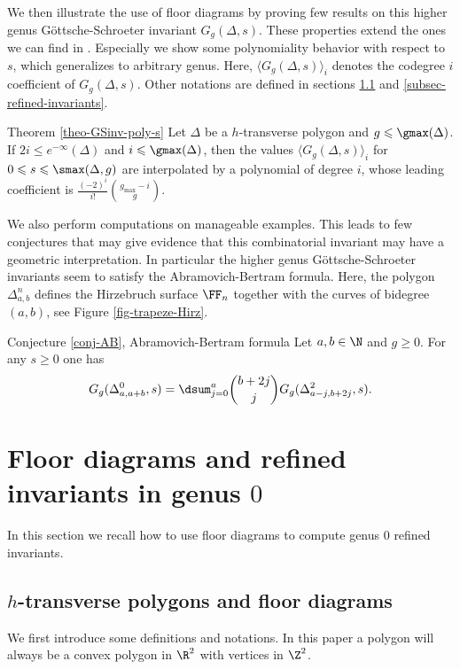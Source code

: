 We then illustrate the use of floor diagrams by proving few results on this higher genus Göttsche-Schroeter invariant $G_g(\Delta,s)$. These properties extend the ones we can find in \cite{brugalle_polynomiality_2022}. Especially we show some polynomiality behavior with respect to $s$, which generalizes \cite[Theorem 1.7]{brugalle_polynomiality_2022} to arbitrary genus. Here, $\langle G_g(\Delta,s) \rangle_i$ denotes the codegree $i$ coefficient of $G_g(\Delta,s)$. Other notations are defined in sections \ref{subsec-polygons-floor-diagrams} and \ref{subsec-refined-invariants}.

\begin{named}{Theorem \ref{theo-GSinv-poly-s}}
Let $\Delta$ be a $h$-transverse polygon and $g \leqslant \gmax(\Delta)$. If $2i \leqslant e^{-\infty}(\Delta)$ and $i \leqslant \gmax(\Delta)$, then the values $\langle G_g(\Delta,s) \rangle_i$ for $0 \leqslant s \leqslant \smax(\Delta,g)$ are interpolated by a polynomial of degree $i$, whose leading coefficient is $\frac{(-2)^i}{i!} \binom{g_{\max}-i}{g}$.
\end{named}

 

We also perform computations on manageable examples. This leads to few conjectures that may give evidence that this combinatorial invariant may have a geometric interpretation. In particular the higher genus Göttsche-Schroeter invariants seem to satisfy the Abramovich-Bertram formula. Here, the polygon $\Delta^n_{a,b}$ defines the Hirzebruch surface $\FF_n$ together with the curves of bidegree $(a,b)$, see Figure \ref{fig-trapeze-Hirz}.

\begin{named}{Conjecture \ref{conj-AB}, Abramovich-Bertram formula}
    Let $a,b \in\N$ and $g\geqslant 0$. For any $s\geqslant0$ one has
    \[ G_g(\Delta^0_{a,a+b},s) = \dsum_{j=0}^a \binom{b+2j}{j} G_g(\Delta^2_{a-j,b+2j},s).  \]
\end{named}

\section{Floor diagrams and refined invariants in genus \texorpdfstring{$0$}{0}} \label{subsec-polydiag}

In this section we recall how to use floor diagrams to compute genus $0$ refined invariants.


\subsection{\texorpdfstring{$h$}{h}-transverse polygons and floor diagrams} \label{subsec-polygons-floor-diagrams}
We first introduce some definitions and notations.
In this paper a polygon will always be a convex polygon in $\R^2$ with vertices in $\Z^2$.

